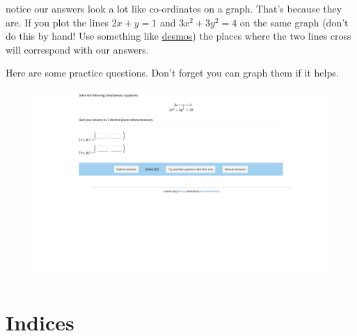 \documentclass[
  a4paper,
]{scrbook}
\begin{document}
\begin{tcolorbox}[enhanced jigsaw, opacityback=0, left=2mm, toptitle=1mm, title=\textcolor{quarto-callout-tip-color}{\faLightbulb}\hspace{0.5em}{Pro tip}, breakable, colbacktitle=quarto-callout-tip-color!10!white, opacitybacktitle=0.6, bottomtitle=1mm, arc=.35mm, colback=white, leftrule=.75mm, bottomrule=.15mm, colframe=quarto-callout-tip-color-frame, rightrule=.15mm, titlerule=0mm, toprule=.15mm, coltitle=black]
notice our answers look a lot like co-ordinates on a graph. That's
because they are. If you plot the lines \(2x+y = 1\) and
\(3x^2+3y^2 = 4\) on the same graph (don't do this by hand! Use
something like \href{https://www.desmos.com/calculator}{desmos}) the
places where the two lines cross will correspond with our answers.
\end{tcolorbox}

Here are some practice questions. Don't forget you can graph them if it
helps.

\begin{figure}

{\centering 

\href{https://numbas.mathcentre.ac.uk/question/65155/simultaneous-equations-quadratics-1/embed/?token=582d176f-c880-4353-abdf-8f51e0c575b6}{\includegraphics{./07-quadratics_files/figure-pdf/unnamed-chunk-5-1.png}}

}

\end{figure}


\hypertarget{indices}{%
\chapter{Indices}\label{indices}}
\end{document}
